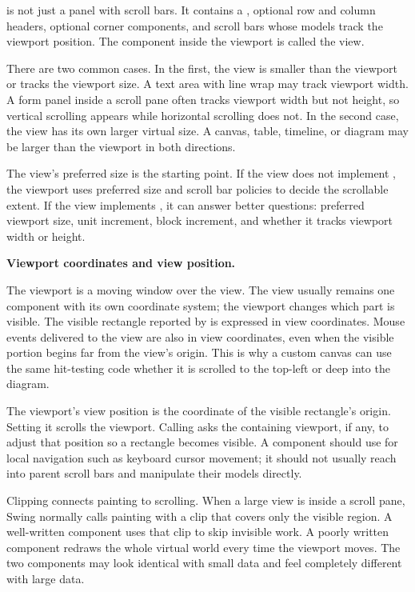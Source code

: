  is not just a panel with scroll bars. It contains a , optional row and column headers, optional corner components, and scroll bars whose models track the viewport position. The component inside the viewport is called the view.

There are two common cases. In the first, the view is smaller than the viewport or tracks the viewport size. A text area with line wrap may track viewport width. A form panel inside a scroll pane often tracks viewport width but not height, so vertical scrolling appears while horizontal scrolling does not. In the second case, the view has its own larger virtual size. A canvas, table, timeline, or diagram may be larger than the viewport in both directions.

The view's preferred size is the starting point. If the view does not implement , the viewport uses preferred size and scroll bar policies to decide the scrollable extent. If the view implements , it can answer better questions: preferred viewport size, unit increment, block increment, and whether it tracks viewport width or height.

\textbf{Viewport coordinates and view position.}

The viewport is a moving window over the view. The view usually remains one
component with its own coordinate system; the viewport changes which part is
visible. The visible rectangle reported by  is expressed in
view coordinates. Mouse events delivered to the view are also in view
coordinates, even when the visible portion begins far from the view's origin.
This is why a custom canvas can use the same hit-testing code whether it is
scrolled to the top-left or deep into the diagram.

The viewport's view position is the coordinate of the visible rectangle's
origin. Setting it scrolls the viewport. Calling  asks
the containing viewport, if any, to adjust that position so a rectangle becomes
visible. A component should use  for local navigation
such as keyboard cursor movement; it should not usually reach into parent scroll
bars and manipulate their models directly.

Clipping connects painting to scrolling. When a large view is inside a scroll
pane, Swing normally calls painting with a clip that covers only the visible
region. A well-written component uses that clip to skip invisible work. A
poorly written component redraws the whole virtual world every time the
viewport moves. The two components may look identical with small data and feel
completely different with large data.

